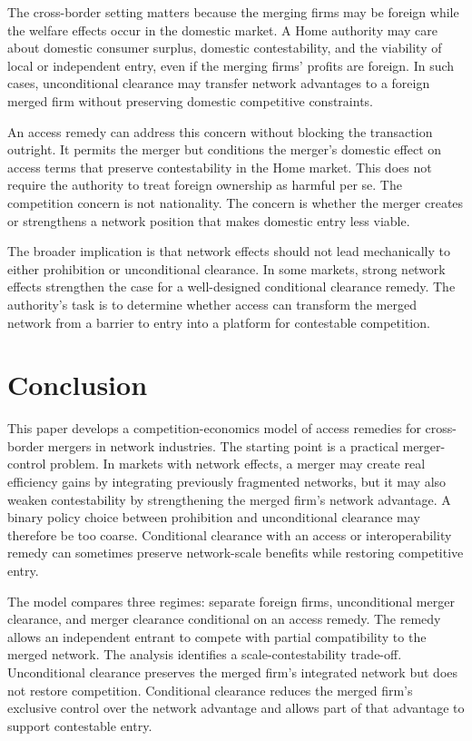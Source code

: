 \documentclass[12pt]{article}
\begin{document}
The cross-border setting matters because the merging firms may be foreign while the welfare effects occur in the domestic market. A Home authority may care about domestic consumer surplus, domestic contestability, and the viability of local or independent entry, even if the merging firms' profits are foreign. In such cases, unconditional clearance may transfer network advantages to a foreign merged firm without preserving domestic competitive constraints.

An access remedy can address this concern without blocking the transaction outright. It permits the merger but conditions the merger's domestic effect on access terms that preserve contestability in the Home market. This does not require the authority to treat foreign ownership as harmful per se. The competition concern is not nationality. The concern is whether the merger creates or strengthens a network position that makes domestic entry less viable.

The broader implication is that network effects should not lead mechanically to either prohibition or unconditional clearance. In some markets, strong network effects strengthen the case for a well-designed conditional clearance remedy. The authority's task is to determine whether access can transform the merged network from a barrier to entry into a platform for contestable competition.

\section{Conclusion}\label{sec:conclusion}

This paper develops a competition-economics model of access remedies for cross-border mergers in network industries. The starting point is a practical merger-control problem. In markets with network effects, a merger may create real efficiency gains by integrating previously fragmented networks, but it may also weaken contestability by strengthening the merged firm's network advantage. A binary policy choice between prohibition and unconditional clearance may therefore be too coarse. Conditional clearance with an access or interoperability remedy can sometimes preserve network-scale benefits while restoring competitive entry.

The model compares three regimes: separate foreign firms, unconditional merger clearance, and merger clearance conditional on an access remedy. The remedy allows an independent entrant to compete with partial compatibility to the merged network. The analysis identifies a scale-contestability trade-off. Unconditional clearance preserves the merged firm's integrated network but does not restore competition. Conditional clearance reduces the merged firm's exclusive control over the network advantage and allows part of that advantage to support contestable entry.
\end{document}
